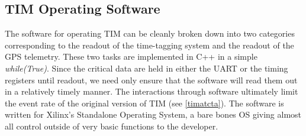 \subsection{TIM Operating Software}%
\label{opsoft}
The software for operating TIM can be cleanly broken down into two categories corresponding to the readout of the time-tagging system and the readout of the GPS telemetry. These two tasks are implemented in C++ in a simple \textit{while(True)}. Since the critical data are held in either the UART or the timing registers until readout, we need only ensure that the software will read them out in a relatively timely manner. The interactions through software ultimately limit the event rate of the original version of TIM (see \autoref{timatcta}). The software is written for Xilinx's Standalone Operating System, a bare bones OS giving almost all control outside of very basic functions to the developer.


